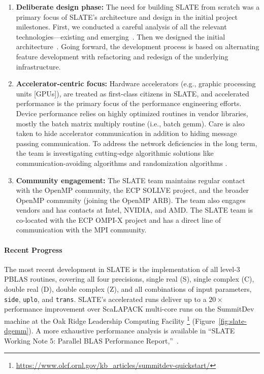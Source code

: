 \begin{enumerate}
\item
\textbf{Deliberate design phase:}
The need for building SLATE from scratch was a 
primary focus of SLATE's architecture and design in the initial project
milestones. First, we conducted a careful analysis of all the relevant 
technologies---existing and emerging~\cite{abdelfattah2017roadmap}.
Then we designed the initial architecture~\cite{kurzak2017designing}.
Going forward, the development process is based on alternating
feature development with refactoring and redesign
of the underlying infrastructure.
\item
\textbf{Accelerator-centric focus:}
Hardware accelerators (e.g., graphic processing units [GPUs]), are treated
as first-class citizens in SLATE, and accelerated performance is the
primary focus of the performance engineering efforts.
Device performance relies on highly optimized routines in vendor libraries,
mostly the batch matrix multiply routine (i.e., batch gemm).
Care is also taken to hide accelerator communication in addition
to hiding message passing communication.
To address the network deficiencies in the long term, the team is investigating
cutting-edge algorithmic solutions like
communication-avoiding algorithms
\cite{ballard2011minimizing}
and randomization algorithms
\cite{mahoney2011randomized}.
\item
\textbf{Community engagement:}
The SLATE team maintains regular contact with the OpenMP community,
the ECP SOLLVE project, and the broader OpenMP community
(joining the OpenMP ARB). The team also engages vendors and has
contacts at Intel, NVIDIA, and AMD. The SLATE team is co-located with the ECP OMPI-X 
project and has a direct line of communication with the MPI community.
\end{enumerate}

\paragraph{Recent Progress}

The most recent development in SLATE is the implementation of all
level-3 PBLAS routines, covering all four precisions,
single real (S), single complex (C), double real (D), double complex (Z),
and all combinations of input parameters, \texttt{side}, \texttt{uplo}, and \texttt{trans}.
SLATE's accelerated runs deliver up to a $20\times$ performance improvement
over ScaLAPACK multi-core runs on the SummitDev machine at the Oak Ridge Leadership
Computing Facility
\footnote{\url{https://www.olcf.ornl.gov/kb_articles/summitdev-quickstart/}}
(Figure~\ref{fig:slate-dgemm}).
A more exhaustive performance analysis is available in
``SLATE Working Note 5: Parallel BLAS Performance Report,''~\cite{kurzak2018parallel}.

